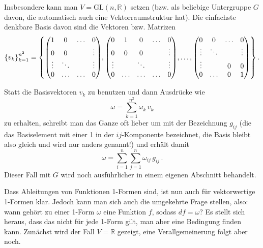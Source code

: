 \documentclass[../H_Analysis_main.tex]{subfiles}
\begin{document}
\begin{bsp}
Insbesondere kann man $V = \text{GL}(n, \mathbb{R})$ setzen (bzw. als beliebige Untergruppe $G$ davon, die automatisch auch eine Vektorraumstruktur hat). Die einfachste denkbare Basis davon sind die Vektoren bzw. Matrizen
\begin{equation*}
\qty{v_k}_{k = 1}^{n^2} = \qty{\mqty(1 & 0 & \dots & 0 \\ 0 & 0 &  & \vdots \\ \vdots & \ddots &  & \vdots\\ 0 & \dots & \dots & 0), \mqty(0 & 1 & 0 & \dots & 0 \\ 0 & 0 & 0 &  & \vdots \\ \vdots &  & \ddots &  & \vdots\\ 0 & \dots & \dots & \dots & 0), \dots, \mqty(0 & 0 & \dots & 0 \\ \vdots & \ddots &  & \vdots \\ \vdots &  & 0 & 0\\ 0 & \dots & 0 & 1)} \, .
\end{equation*}

Statt die Basisvektoren $v_k$ zu benutzen und dann Ausdrücke wie
\begin{equation*}
\omega = \sum_{k = 1}^{n^2} \omega_k \, v_k
\end{equation*}
zu erhalten, schreibt man das Ganze oft lieber um mit der Bezeichnung $g_{ij}$ (die das Basiselement mit einer 1 in der $ij$-Komponente bezeichnet, die Basis bleibt also gleich und wird nur anders genannt!) und erhält damit
\begin{equation*}
\omega = \sum_{i = 1}^n \sum_{j = 1}^n \omega_{ij} \, g_{ij} \, .
\end{equation*}
Dieser Fall mit $G$ wird noch ausführlicher in einem eigenen Abschnitt behandelt.
\end{bsp}

Dass Ableitungen von Funktionen 1-Formen sind, ist nun auch für vektorwertige 1-Formen klar. Jedoch kann man sich auch die umgekehrte Frage stellen, also: wann gehört zu einer 1-Form $\omega$ eine Funktion $f$, sodass $df = \omega$? Es stellt sich heraus, dass das nicht für jede 1-Form gilt, man aber eine Bedingung finden kann. Zunächst wird der Fall $V = \mathbb{R}$ gezeigt, eine Verallgemeinerung folgt aber noch.
\end{document}
